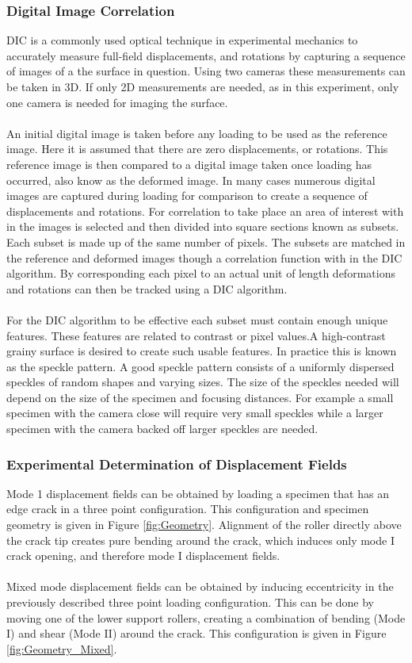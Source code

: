 \documentclass[12pt]{article}
\begin{document}
\subsubsection{Digital Image Correlation} %
DIC is a commonly used optical technique in experimental mechanics to accurately measure full-field displacements, and rotations by capturing a sequence of images of a the surface in question. Using two cameras these measurements can be taken in 3D. If only 2D measurements are needed, as in this experiment, only one camera is needed for imaging the surface.
\\
\\
An initial digital image is taken before any loading to be used as the reference image. Here it is assumed that there are zero displacements, or rotations.  This reference image is then compared to a digital image taken once loading has occurred, also know as the deformed image. In many cases numerous digital images are captured during loading for comparison to create a sequence of displacements and rotations.  For correlation to take place an area of interest with in the images is selected and then divided into square sections known as subsets. Each subset is made up of the same number of pixels.  The subsets are matched in the reference and deformed images though a correlation function with in the DIC algorithm. By corresponding each pixel to an actual unit of length deformations and rotations can then be tracked using a DIC algorithm.
\\
\\
For the DIC algorithm to be effective each subset must contain enough unique features.  These features are related to contrast or pixel values.A high-contrast grainy surface is desired to create such usable features. In practice this is known as the speckle pattern. A good speckle pattern consists of a uniformly dispersed speckles of  random shapes and varying sizes. The size of the speckles needed will depend on the size of the specimen and focusing distances. For example a small specimen with the camera close will require very small speckles while a larger specimen with the camera backed off larger speckles are needed. 

\subsubsection{Experimental Determination of Displacement Fields} %
Mode 1 displacement fields can be obtained by loading a specimen that has an edge crack in a three point configuration. This configuration and specimen geometry is given in Figure \ref{fig:Geometry}. Alignment of the roller directly above the crack tip creates pure bending around the crack, which induces only mode I crack opening, and therefore mode I displacement fields.
\\ \\
Mixed mode displacement fields can be obtained by inducing eccentricity in the previously described three point loading configuration. This can be done by moving one of the lower support rollers, creating a combination of bending (Mode I) and shear (Mode II) around the crack. This configuration is given in Figure \ref{fig:Geometry_Mixed}.  
\end{document}
